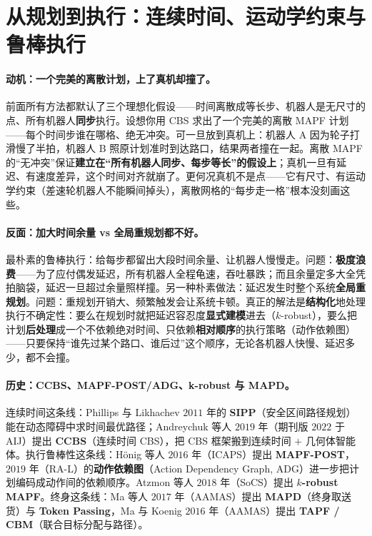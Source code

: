 \section{从规划到执行：连续时间、运动学约束与鲁棒执行}
\label{sec:mapf-exec}

\paragraph{动机：一个完美的离散计划，上了真机却撞了。}
前面所有方法都默认了三个理想化假设——时间离散成等长步、机器人是无尺寸的点、所有机器人\textbf{同步}执行。设想你用 CBS 求出了一个完美的离散 MAPF 计划——每个时间步谁在哪格、绝无冲突。可一旦放到真机上：机器人 A 因为轮子打滑慢了半拍，机器人 B 照原计划准时到达路口，结果两者撞在一起。离散 MAPF 的“无冲突”保证\textbf{建立在“所有机器人同步、每步等长”的假设上}；真机一旦有延迟、有速度差异，这个时间对齐就崩了。更何况真机不是点——它有尺寸、有运动学约束（差速轮机器人不能瞬间掉头），离散网格的“每步走一格”根本没刻画这些。

\paragraph{反面：加大时间余量 vs 全局重规划都不好。}
最朴素的鲁棒执行：给每步都留出大段时间余量、让机器人慢慢走。问题：\textbf{极度浪费}——为了应付偶发延迟，所有机器人全程龟速，吞吐暴跌；而且余量定多大全凭拍脑袋，延迟一旦超过余量照样撞。另一种朴素做法：延迟发生时整个系统\textbf{全局重规划}。问题：重规划开销大、频繁触发会让系统卡顿。真正的解法是\textbf{结构化}地处理执行不确定性：要么在规划时就把延迟容忍度\textbf{显式建模}进去（$k$-robust），要么把计划\textbf{后处理}成一个不依赖绝对时间、只依赖\textbf{相对顺序}的执行策略（动作依赖图）——只要保持“谁先过某个路口、谁后过”这个顺序，无论各机器人快慢、延迟多少，都不会撞。

\paragraph{历史：CCBS、MAPF-POST/ADG、k-robust 与 MAPD。}
连续时间这条线：Phillips 与 Likhachev $2011$ 年的 \textbf{SIPP}（安全区间路径规划）能在动态障碍中求时间最优路径\cite{phillips2011sipp}；Andreychuk 等人 $2019$ 年（期刊版 $2022$ 于 AIJ）提出 \textbf{CCBS}（连续时间 CBS），把 CBS 框架搬到连续时间 $+$ 几何体智能体\cite{andreychuk2022ccbs}。执行鲁棒性这条线：H\"onig 等人 $2016$ 年（ICAPS）提出 \textbf{MAPF-POST}\cite{honig2016mapfpost}，$2019$ 年（RA-L）的\textbf{动作依赖图}（Action Dependency Graph, ADG）进一步把计划编码成动作间的依赖顺序\cite{honig2019persistent}。Atzmon 等人 $2018$ 年（SoCS）提出 \textbf{$k$-robust MAPF}\cite{atzmon2018krobust}。终身这条线：Ma 等人 $2017$ 年（AAMAS）提出 \textbf{MAPD}（终身取送货）与 \textbf{Token Passing}\cite{ma2017lifelong}，Ma 与 Koenig $2016$ 年（AAMAS）提出 \textbf{TAPF / CBM}（联合目标分配与路径）\cite{ma2016optimal}。


